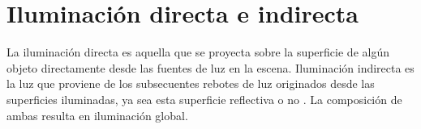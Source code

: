 \section{Iluminación directa e indirecta}
\label{sec:direct_indirect}
La iluminación directa es aquella que se proyecta sobre la superficie de algún objeto directamente desde las fuentes de luz en la escena. Iluminación indirecta es la luz que proviene de los subsecuentes rebotes de luz originados desde las superficies iluminadas, ya sea esta superficie reflectiva o no \cite{advanced_gi2006}. La composición de ambas resulta en iluminación global.
